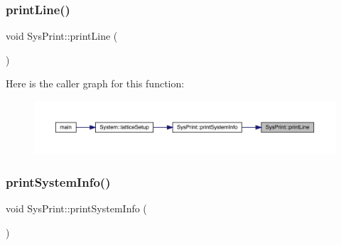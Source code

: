 \subsubsection{\texorpdfstring{printLine()}{printLine()}}
{\footnotesize\ttfamily void Sys\+Print\+::print\+Line (\begin{DoxyParamCaption}{ }\end{DoxyParamCaption})\hspace{0.3cm}{\ttfamily [static]}}

Here is the caller graph for this function\+:\nopagebreak
\begin{figure}[H]
\begin{center}
\leavevmode
\includegraphics[width=350pt]{class_sys_print_abdf8282e73cc002e5e572c6f09266cc9_icgraph}
\end{center}
\end{figure}
\mbox{\label{class_sys_print_a4572572643f6f4685081a3ae419e5ca9}} 
\subsubsection{\texorpdfstring{printSystemInfo()}{printSystemInfo()}}
{\footnotesize\ttfamily void Sys\+Print\+::print\+System\+Info (\begin{DoxyParamCaption}{ }\end{DoxyParamCaption})\hspace{0.3cm}{\ttfamily [static]}}

